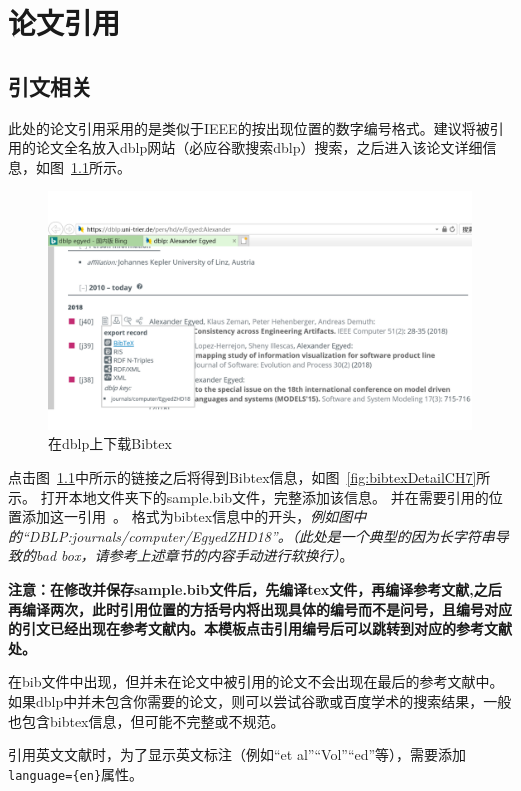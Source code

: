 \chapter{论文引用}

\section{引文相关}
此处的论文引用采用的是类似于IEEE的按出现位置的数字编号格式。建议将被引用的论文全名放入dblp网站（必应谷歌搜索dblp）搜索，之后进入该论文详细信息，如图~\ref{fig:dblpForBibtexCH7}所示。

\begin{figure}[htb]
  \centering
  \includegraphics[width=5in]{figure/chapter7/dblpForBibtex.pdf}
  \caption{在dblp上下载Bibtex}
  \label{fig:dblpForBibtexCH7}
\end{figure}

点击图~\ref{fig:dblpForBibtexCH7}中所示的链接之后将得到Bibtex信息，如图~\ref{fig:bibtexDetailCH7}所示。
打开本地文件夹下的sample.bib文件，完整添加该信息。
并在需要引用的位置添加这一引用~\cite{DBLP:journals/computer/EgyedZHD18}。
格式为bibtex信息中的开头，\emph{例如图中的“DBLP:journals/computer/EgyedZHD18”。（此处是一个典型的因为长字符串导致的bad box，请参考上述章节的内容手动进行软换行）}。

\textbf{注意：在修改并保存sample.bib文件后，先编译tex文件，再编译参考文献,之后再编译两次，此时引用位置的方括号内将出现具体的编号而不是问号，且编号对应的引文已经出现在参考文献内。本模板点击引用编号后可以跳转到对应的参考文献处。}

在bib文件中出现，但并未在论文中被引用的论文不会出现在最后的参考文献中。如果dblp中并未包含你需要的论文，则可以尝试谷歌或百度学术的搜索结果，一般也包含bibtex信息，但可能不完整或不规范。

引用英文文献时，为了显示英文标注（例如“et al”“Vol”“ed”等），需要添加\texttt{language=\{en\}}属性。

